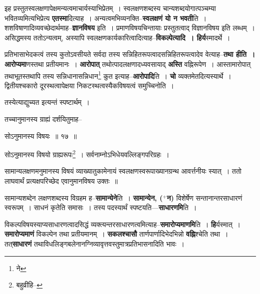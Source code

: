 \documentclass[article,12pt,a4paper]{memoir}
\newcommand{\add}[1]{($^{+}$#1)}
\begin{document}
	  \pstart इह प्रस्तुतस्वलक्षणापेक्षमन्यत्वमाचार्यस्याभिप्रेतम् । स्वलक्षणशब्दस्य चान्यशब्दयोगात्पञ्चम्या भवितव्यमित्यभिप्रेत्य \textbf{एतस्मा}दित्याह । अन्यत्वमभिव्यनक्ति--\textbf{स्वलक्षणं यो न भवती}ति । शशविषाणादिव्यवच्छेदार्थमाह--\textbf{ज्ञानविषय} इति । प्रमाणविषयचिन्तायाः प्रस्तुतत्वाद् विज्ञानविषय इति लब्धम् । असिद्धमस्य ततोऽन्यत्वम्, अस्यापि स्वलक्षणकार्यकारित्वादित्याह--\textbf{विकल्पेत्यादि । हिर्य}स्मादर्थे ।
	\pend
      

	  \pstart प्रतिभासाभेदकत्वं तस्य कुतोऽवसीयते सर्वदा तस्य सन्निहितरूपत्वादसन्निहितरूपत्वादेव वेत्याह--\textbf{तथा हीति । आरोप्यमा}णस्तथा प्रतीयमानः । \textbf{आरोपात्} तथोत्पादलक्षणादध्यवसायाद् \textbf{अस्ति} वह्निरूपेण । आस्तामारोपात् तथाभूतस्तथापि तस्य सन्निधानासन्निधान\footnote{ने} कुत इत्याह--\textbf{आरोपादि}ति । \textbf{चो} व्यक्तमेतदित्यस्यार्थे । द्वितीयश्चकारो दूरस्थत्वापेक्षया निकटस्थत्वस्यैकविषयत्वं समुच्चिनोति ।
	\pend
      

	  \pstart तस्येत्याद्युच्यत इत्यन्तं स्पष्टार्थम् ।
	\pend
      \leavevmode{}
	  \bigskip
	  \begingroup
	

	  \pstart तच्चानुमानस्य ग्राह्यं दर्शयितुमाह--
	\pend
       
	  \bigskip
	  \begingroup
	

	  \pstart सोऽनुमानस्य विषयः ॥ १७ ॥
	\pend
      
	  \endgroup
	 

	  \pstart सोऽनुमानस्य विषयो ग्राह्यरूपः\footnote{बहुव्रीहि--\cite{dp-msD-n}} । सर्वनाम्नोऽभिधेयवल्लिङ्गपरिग्रहः ।
	\pend
       

	  \pstart सामान्यलक्षणमनुमानस्य विषयं व्याख्यातुकामेनायं स्वलक्षणस्वरूपाख्यानग्रन्थ आवर्त्तनीयः स्यात् । ततो लाघवार्थं प्रत्यक्षपरिच्छेद एवानुमानविषय उक्तः ॥
	\pend
      
	  \endgroup
	

	  \pstart सामान्यशब्देन लक्षणशब्दस्य विग्रहम ह--\textbf{सामान्येने}ति । \textbf{सामान्येन, \add{न}} विशेर्षेण सन्तानान्तरसाधारणं स्वरूपम् । साधनं कृतेति समासः । तस्य पदस्यार्थं स्पष्टयति—\textbf{साधारणमि}ति ।
	\pend
      

	  \pstart विकल्पविषयस्याप्यसाधारणत्वादसिद्धं व्यक्त्यन्तरसाधारणत्वमित्याह--\textbf{समारोप्यमाणमि}ति । \textbf{हि}र्यस्मात् । \textbf{समारोप्यमाणं} विकल्पेन तथा प्रतीयमानम् । \textbf{सकलश्चासौ} तार्णपार्णादिभेदभिन्नो \textbf{वह्नि}श्चेति तथा । तत्\textbf{साधारणं} तथाविधलिङ्गबलेनानग्निव्यावृत्तवस्तुमात्रप्रतिभासनादिति भावः ।
	\pend
      
\end{document}

